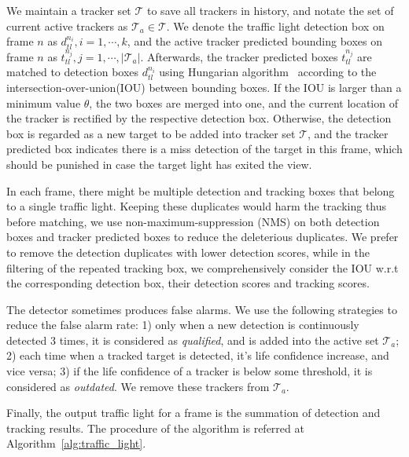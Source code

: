 We maintain a tracker set $\mathcal{T}$ to save all trackers in history, and notate the set of current active trackers as $\mathcal{T}_a \in \mathcal{T}$. We denote the traffic light detection box on frame $n$ as $d_{tl}^{n_i}, i=1,\cdots, k$, and the active tracker predicted bounding boxes on frame $n$ as $t_{tl}^{n_j}, j=1,\cdots, |\mathcal{T}_a|$. Afterwards, the tracker predicted boxes $t_{tl}^{n_j}$ are matched to detection boxes $d_{tl}^{n_i}$ using Hungarian algorithm~\cite{kuhn-munkres:1955} according to the intersection-over-union(IOU) between bounding boxes. If the IOU is larger than a minimum value $\theta$, the two boxes are merged into one, and the current location of the tracker is rectified by the respective detection box. Otherwise, the detection box is regarded as a new target to be added into tracker set $\mathcal{T}$, and the tracker predicted box indicates there is a miss detection of the target in this frame, which should be punished in case the target light has exited the view.
 
In each frame, there might be multiple detection and tracking boxes that belong to a single traffic light. Keeping these duplicates would harm the tracking  thus  before matching, we use non-maximum-suppression (NMS) on both detection boxes and tracker predicted boxes to reduce the deleterious duplicates. We prefer to remove the detection duplicates with lower detection scores, while in the filtering of the repeated tracking box, we comprehensively consider the IOU w.r.t the corresponding detection box, their detection scores and tracking scores.

 The detector sometimes produces false alarms. We use the following strategies to reduce the false alarm rate: 1) only when a new detection is continuously detected 3 times, it is considered as \emph{qualified}, and is added into the active set $\mathcal{T}_a$; 2) each time when a tracked target is detected, it's life confidence increase, and vice versa; 3) if the life confidence of a tracker is below some threshold, it is considered as \emph{outdated}. We remove these trackers from $\mathcal{T}_a$. 

Finally, the output traffic light for a frame is the summation of detection and tracking results. The procedure of the algorithm is referred at Algorithm~\ref{alg:traffic_light}.   


